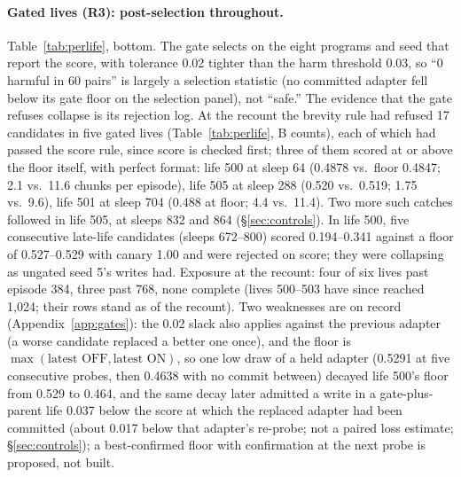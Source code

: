 \documentclass{article}
\begin{document}
\paragraph{Gated lives (R3): post-selection throughout.} Table~\ref{tab:perlife}, bottom. The gate selects on the eight programs and seed that report the score, with tolerance 0.02 tighter than the harm threshold 0.03, so ``0 harmful in 60 pairs'' is largely a selection statistic (no committed adapter fell below its gate floor on the selection panel), not ``safe.'' The evidence that the gate refuses collapse is its rejection log. At the recount the brevity rule had refused 17 candidates in five gated lives (Table~\ref{tab:perlife}, B counts), each of which had passed the score rule, since score is checked first; three of them scored at or above the floor itself, with perfect format: life 500 at sleep 64 (0.4878 vs.\ floor 0.4847; 2.1 vs.\ 11.6 chunks per episode), life 505 at sleep 288 (0.520 vs.\ 0.519; 1.75 vs.\ 9.6), life 501 at sleep 704 (0.488 at floor; 4.4 vs.\ 11.4). Two more such catches followed in life 505, at sleeps 832 and 864 (\S\ref{sec:controls}).
In life 500, five consecutive late-life candidates (sleeps 672--800) scored 0.194--0.341 against a floor of 0.527--0.529 with canary 1.00 and were rejected on score; they were collapsing as ungated seed 5's writes had. Exposure at the recount: four of six lives past episode 384, three past 768, none complete (lives 500--503 have since reached 1{,}024; their rows stand as of the recount). Two weaknesses are on record (Appendix~\ref{app:gates}): the 0.02 slack also applies against the previous adapter (a worse candidate replaced a better one once), and the floor is $\max(\text{latest OFF}, \text{latest ON})$, so one low draw of a held adapter (0.5291 at five consecutive probes, then 0.4638 with no commit between) decayed life 500's floor from 0.529 to 0.464, and the same decay later admitted a write in a gate-plus-parent life 0.037 below the score at which the replaced adapter had been committed (about 0.017 below that adapter's re-probe; not a paired loss estimate; \S\ref{sec:controls}); a best-confirmed floor with confirmation at the next probe is proposed, not built. %
\end{document}
